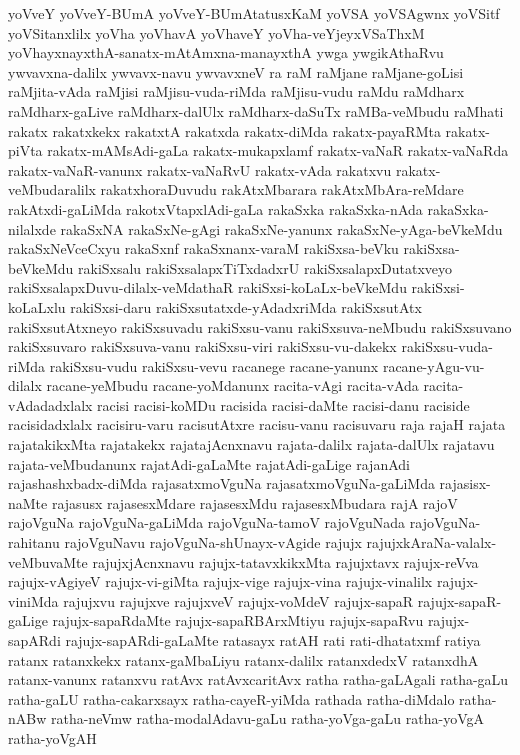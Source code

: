 {yoVveY
yoVveY-BUmA
yoVveY-BUmAtatusxKaM
yoVSA
yoVSAgwnx
yoVSitf
yoVSitanxlilx
yoVha
yoVhavA
yoVhaveY
yoVha-veYjeyxVSaThxM
yoVhayxnayxthA-sanatx-mAtAmxna-manayxthA
ywga
ywgikAthaRvu
ywvavxna-dalilx
ywvavx-navu
ywvavxneV
ra
raM
raMjane
raMjane-goLisi
raMjita-vAda
raMjisi
raMjisu-vuda-riMda
raMjisu-vudu
raMdu
raMdharx
raMdharx-gaLive
raMdharx-dalUlx
raMdharx-daSuTx
raMBa-veMbudu
raMhati
rakatx
rakatxkekx
rakatxtA
rakatxda
rakatx-diMda
rakatx-payaRMta
rakatx-piVta
rakatx-mAMsAdi-gaLa
rakatx-mukapxlamf
rakatx-vaNaR
rakatx-vaNaRda
rakatx-vaNaR-vanunx
rakatx-vaNaRvU
rakatx-vAda
rakatxvu
rakatx-veMbudaralilx
rakatxhoraDuvudu
rakAtxMbarara
rakAtxMbAra-reMdare
rakAtxdi-gaLiMda
rakotxVtapxlAdi-gaLa
rakaSxka
rakaSxka-nAda
rakaSxka-nilalxde
rakaSxNA
rakaSxNe-gAgi
rakaSxNe-yanunx
rakaSxNe-yAga-beVkeMdu
rakaSxNeVceCxyu
rakaSxnf
rakaSxnanx-varaM
rakiSxsa-beVku
rakiSxsa-beVkeMdu
rakiSxsalu
rakiSxsalapxTiTxdadxrU
rakiSxsalapxDutatxveyo
rakiSxsalapxDuvu-dilalx-veMdathaR
rakiSxsi-koLaLx-beVkeMdu
rakiSxsi-koLaLxlu
rakiSxsi-daru
rakiSxsutatxde-yAdadxriMda
rakiSxsutAtx
rakiSxsutAtxneyo
rakiSxsuvadu
rakiSxsu-vanu
rakiSxsuva-neMbudu
rakiSxsuvano
rakiSxsuvaro
rakiSxsuva-vanu
rakiSxsu-viri
rakiSxsu-vu-dakekx
rakiSxsu-vuda-riMda
rakiSxsu-vudu
rakiSxsu-vevu
racanege
racane-yanunx
racane-yAgu-vu-dilalx
racane-yeMbudu
racane-yoMdanunx
racita-vAgi
racita-vAda
racita-vAdadadxlalx
racisi
racisi-koMDu
racisida
racisi-daMte
racisi-danu
raciside
racisidadxlalx
racisiru-varu
racisutAtxre
racisu-vanu
racisuvaru
raja
rajaH
rajata
rajatakikxMta
rajatakekx
rajatajAcnxnavu
rajata-dalilx
rajata-dalUlx
rajatavu
rajata-veMbudanunx
rajatAdi-gaLaMte
rajatAdi-gaLige
rajanAdi
rajashashxbadx-diMda
rajasatxmoVguNa
rajasatxmoVguNa-gaLiMda
rajasisx-naMte
rajasusx
rajasesxMdare
rajasesxMdu
rajasesxMbudara
rajA
rajoV
rajoVguNa
rajoVguNa-gaLiMda
rajoVguNa-tamoV
rajoVguNada
rajoVguNa-rahitanu
rajoVguNavu
rajoVguNa-shUnayx-vAgide
rajujx
rajujxkAraNa-valalx-veMbuvaMte
rajujxjAcnxnavu
rajujx-tatavxkikxMta
rajujxtavx
rajujx-reVva
rajujx-vAgiyeV
rajujx-vi-giMta
rajujx-vige
rajujx-vina
rajujx-vinalilx
rajujx-viniMda
rajujxvu
rajujxve
rajujxveV
rajujx-voMdeV
rajujx-sapaR
rajujx-sapaR-gaLige
rajujx-sapaRdaMte
rajujx-sapaRBArxMtiyu
rajujx-sapaRvu
rajujx-sapARdi
rajujx-sapARdi-gaLaMte
ratasayx
ratAH
rati
rati-dhatatxmf
ratiya
ratanx
ratanxkekx
ratanx-gaMbaLiyu
ratanx-dalilx
ratanxdedxV
ratanxdhA
ratanx-vanunx
ratanxvu
ratAvx
ratAvxcaritAvx
ratha
ratha-gaLAgali
ratha-gaLu
ratha-gaLU
ratha-cakarxsayx
ratha-cayeR-yiMda
rathada
ratha-diMdalo
ratha-nABw
ratha-neVmw
ratha-modalAdavu-gaLu
ratha-yoVga-gaLu
ratha-yoVgA
ratha-yoVgAH
}
